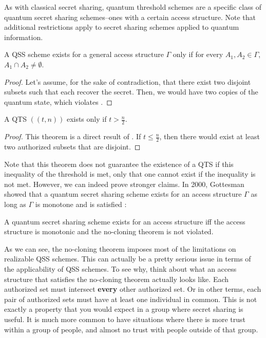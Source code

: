 As with classical secret sharing, quantum threshold schemes are a specific class of quantum secret sharing schemes--ones with a certain access structure. Note that additional restrictions apply to secret sharing schemes applied to quantum information.

\begin{theorem}
    \label{thm:qss-disjoint}
    A QSS scheme exists for a general access structure $\Gamma$ only if for every $A_1, A_2 \in \Gamma$, $A_1 \cap A_2 \neq \emptyset$.
\end{theorem}

\begin{proof}
    Let's assume, for the sake of contradiction, that there exist two disjoint subsets such that each recover the secret. Then, we would have two copies of the quantum state, which violates . 
\end{proof}

\begin{theorem}
    \label{thm:qts}
    A QTS $((t,n))$ exists only if $t > \frac{n}{2}$.
\end{theorem}

\begin{proof}
    This theorem is a direct result of . If $t \leq \frac{n}{2}$, then there would exist at least two authorized subsets that are disjoint. 
\end{proof}

Note that this theorem does not guarantee the existence of a QTS if this inequality of the threshold is met, only that one cannot exist if the inequality is not met. However, we can indeed prove stronger claims. In 2000, Gottesman showed that a quantum secret sharing scheme exists for an access structure $\Gamma$ as long as $\Gamma$ is monotone and  is satisfied \cite{gottesman_theory_2000}:

\begin{theorem}
    \label{thm:monotone-gamma}
    A quantum secret sharing scheme exists for an access structure iff the access structure is monotonic and the no-cloning theorem is not violated.
\end{theorem}

As we can see, the no-cloning theorem imposes most of the limitations on realizable QSS schemes. This can actually be a pretty serious issue in terms of the applicability of QSS schemes. To see why, think about what an access structure that satisfies the no-cloning theorem actually looks like. Each authorized set must intersect \textbf{every} other authorized set. Or in other terms, each pair of authorized sets must have at least one individual in common. This is not exactly a property that you would expect in a group where secret sharing is useful. It is much more common to have situations where there is more trust within a group of people, and almost no trust with people outside of that group.

